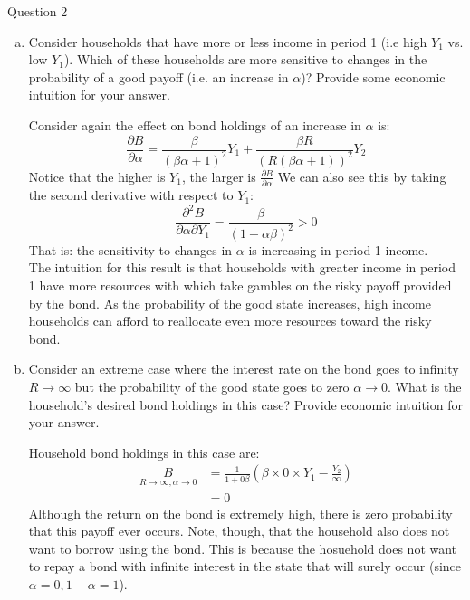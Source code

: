 \documentclass[a4paper]{article}
\newif\IfInSansMode
\begin{document}
\begin{questionbox}{Question 2}
\begin{enumerate}[(a)]
\begin{explanationbox}
				\end{explanationbox}
				\item Consider households that have more or less income in period 1 (i.e high \( Y_1 \) vs. low \( Y_1 \)). Which of these households are more sensitive to changes in the probability of a good payoﬀ (i.e. an increase in \( \alpha \))? Provide some economic intuition for your answer.
				\begin{explanationbox}
					Consider again the eﬀect on bond holdings of an increase in \( \alpha \) is:
					\[
						\frac{\partial B}{\partial \alpha} = \frac{\beta}{(\beta\alpha+1)^2}Y_1 + \frac{\beta R}{(R(\beta\alpha + 1))^2}Y_2
					\]
					Notice that the higher is \( Y_1 \), the larger is \( \frac{\partial B}{\partial \alpha} \) We can also see this by taking the second derivative with respect to \( Y_1 \):
					\[
						\frac{\partial^2 B}{\partial \alpha \partial Y_1} = \frac{\beta}{(1+\alpha\beta)^2} > 0
					\]
					That is: the sensitivity to changes in \( \alpha \) is increasing in period 1 income.\\
					The intuition for this result is that households with greater income in period 1 have more resources with which take gambles on the risky payoﬀ provided by the bond. As the probability of the good state increases, high income households can aﬀord to reallocate even more resources toward the risky bond.
				\end{explanationbox}
				\item Consider an extreme case where the interest rate on the bond goes to inﬁnity \( R \rightarrow \infty \) but the probability of the good state goes to zero \( \alpha \rightarrow 0 \). What is the household’s desired bond holdings in this case? Provide economic intuition for your answer.
				\begin{explanationbox}
					Household bond holdings in this case are:
					\begin{align*}
						\underset{R \rightarrow \infty,\alpha \rightarrow 0}{B} &= \frac{1}{1+0\beta} \left( \beta \times 0 \times Y_1 - \frac{Y_2}{\infty} \right) \\
						&= 0
					\end{align*}
					Although the return on the bond is extremely high, there is zero probability that this payoﬀ ever occurs. Note, though, that the household also does not want to borrow using the bond. This is because the hosuehold does not want to repay a bond with inﬁnite interest in the state that will surely occur (since \( \alpha = 0, 1 - \alpha = 1 \)).
				\end{explanationbox}
			\end{enumerate}
	\end{questionbox}
\end{document}
